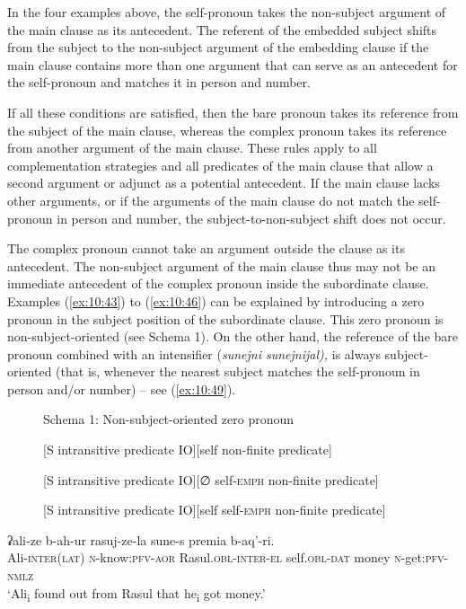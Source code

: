 ﻿\documentclass[output=paper]{langsci/langscibook}
\begin{document}
In the four examples above, the self-pronoun takes the non-subject
argument of the main clause as its antecedent. The referent of the
embedded subject shifts from the subject to the non-subject argument of
the embedding clause if the main clause contains more than one argument
that can serve as an antecedent for the self-pronoun and matches it in
person and number.

If all these conditions are satisfied, then the bare pronoun takes its
reference from the subject of the main clause, whereas the complex
pronoun takes its reference from another argument of the main clause.
These rules apply to all complementation strategies and all predicates
of the main clause that allow a second argument or adjunct as a
potential antecedent. If the main clause lacks other arguments, or if the
arguments of the main clause do not match the self-pronoun in person and
number, the subject-to-non-subject shift does not occur.

The complex pronoun cannot take an argument outside the clause as its
antecedent. The non-subject argument of the main clause thus may not be
an immediate antecedent of the complex pronoun inside the subordinate
clause. Examples (\ref{ex:10:43}) to (\ref{ex:10:46}) can be explained by introducing a zero
pronoun in the subject position of the subordinate clause. This zero
pronoun is non-subject-oriented (see Schema 1). On the other hand, the
reference of the bare pronoun combined with an intensifier
(\emph{sunejni sunejnijal),} is always subject-oriented (that is,
whenever the nearest subject matches the self-pronoun in person and/or
number) – see (\ref{ex:10:49}).

\begin{figure}[h]
\centerline{\footnotesize Schema 1: Non-subject-oriented zero pronoun}

\medskip

[S intransitive predicate IO][self non-finite predicate]

[S intransitive predicate IO][∅ self-\textsc{emph} non-finite
predicate]

[S intransitive predicate IO][self self-\textsc{emph} non-finite
predicate]
\end{figure}


\ea %
\gll  ʡali-ze b-ah-ur rasuj-ze-la sune-s premia b-aq'-ri.\\
Ali-\textsc{inter}(\textsc{lat}) \textsc{n}-know:\textsc{pfv}-\textsc{aor} Rasul.\textsc{obl}-\textsc{inter}-\textsc{el} self.\textsc{obl}-\textsc{dat} money \textsc{n}-get:\textsc{pfv}-\textsc{nmlz}\\ 
\glt `Ali\textsubscript{i} found out from Rasul that he\textsubscript{i} got
money.'
\end{document}
